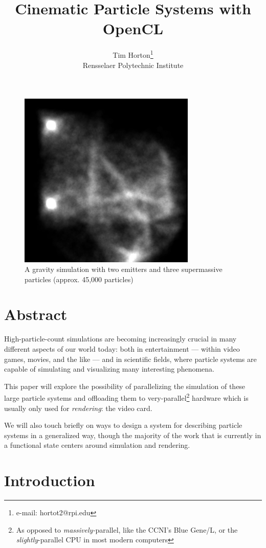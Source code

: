 \documentclass{acmsiggraph}
\title{Cinematic Particle Systems with OpenCL}
\author{Tim Horton\thanks{e-mail: hortot2@rpi.edu}\\Rensselaer Polytechnic Institute}
\begin{document}
\maketitle

\begin{figure}
    \includegraphics[width=84.5mm]{gravity.png}
    \caption{A gravity simulation with two emitters and three supermassive particles (approx. 45,000 particles)}
\end{figure}

\section*{Abstract}

High-particle-count simulations are becoming increasingly crucial in many different aspects of our world today: both in entertainment --- within video games, movies, and the like --- and in scientific fields, where particle systems are capable of simulating and visualizing many interesting phenomena.

This paper will explore the possibility of parallelizing the simulation of these large particle systems and offloading them to very-parallel\footnote{As opposed to {\it massively-}parallel, like the CCNI's Blue Gene/L, or the {\it slightly}-parallel CPU in most modern computers} hardware which is usually only used for {\it rendering}: the video card.

We will also touch briefly on ways to design a system for describing particle systems in a generalized way, though the majority of the work that is currently in a functional state centers around simulation and rendering.

\section{Introduction}
\end{document}
